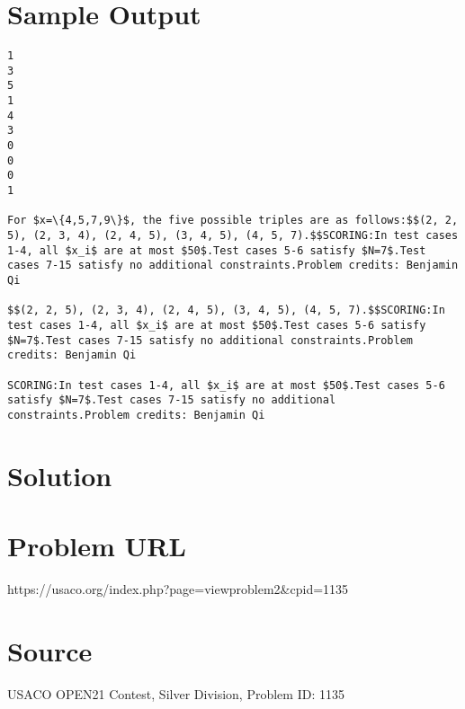 \documentclass[12pt]{article}
\begin{document}
\section*{Sample Output}
\begin{verbatim}
1
3
5
1
4
3
0
0
0
1

For $x=\{4,5,7,9\}$, the five possible triples are as follows:$$(2, 2, 5), (2, 3, 4), (2, 4, 5), (3, 4, 5), (4, 5, 7).$$SCORING:In test cases 1-4, all $x_i$ are at most $50$.Test cases 5-6 satisfy $N=7$.Test cases 7-15 satisfy no additional constraints.Problem credits: Benjamin Qi

$$(2, 2, 5), (2, 3, 4), (2, 4, 5), (3, 4, 5), (4, 5, 7).$$SCORING:In test cases 1-4, all $x_i$ are at most $50$.Test cases 5-6 satisfy $N=7$.Test cases 7-15 satisfy no additional constraints.Problem credits: Benjamin Qi

SCORING:In test cases 1-4, all $x_i$ are at most $50$.Test cases 5-6 satisfy $N=7$.Test cases 7-15 satisfy no additional constraints.Problem credits: Benjamin Qi
\end{verbatim}

\section*{Solution}


\section*{Problem URL}
https://usaco.org/index.php?page=viewproblem2&cpid=1135

\section*{Source}
USACO OPEN21 Contest, Silver Division, Problem ID: 1135
\end{document}

